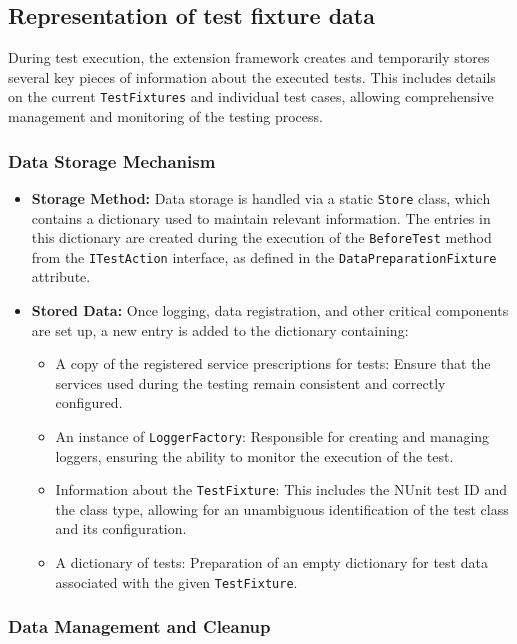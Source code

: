  \subsection{Representation of test fixture data}
 During test execution, the extension framework creates and temporarily stores several key pieces of information about the executed tests. This includes details on the current \texttt{TestFixtures} and individual test cases, allowing comprehensive management and monitoring of the testing process.

\subsubsection{Data Storage Mechanism}

\begin{itemize}
    \item \textbf{Storage Method:}  
    Data storage is handled via a static \texttt{Store} class, which contains a dictionary used to maintain relevant information. The entries in this dictionary are created during the execution of the \texttt{BeforeTest} method from the \texttt{ITestAction} interface, as defined in the \texttt{DataPreparationFixture} attribute.  
    
    \item \textbf{Stored Data:}  
    Once logging, data registration, and other critical components are set up, a new entry is added to the dictionary containing: \begin{itemize}
        \item A copy of the registered service prescriptions for tests: Ensure that the services used during the testing remain consistent and correctly configured.
        \item An instance of \texttt{LoggerFactory}: Responsible for creating and managing loggers, ensuring the ability to monitor the execution of the test.
        \item Information about the \texttt{TestFixture}: This includes the NUnit test ID and the class type, allowing for an unambiguous identification of the test class and its configuration.
        \item A dictionary of tests: Preparation of an empty dictionary for test data associated with the given \texttt{TestFixture}.
    \end{itemize}
\end{itemize}

\subsubsection{Data Management and Cleanup}

